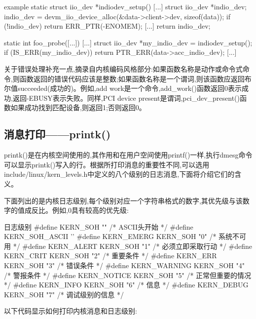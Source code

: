 \documentclass[lang=cn,newtx,10pt,scheme=chinese]{elegantbook}
\begin{document}
\begin{mycode}{example}
static struct iio_dev *indiodev_setup(){
    [...]
    struct iio_dev *indio_dev;
    indio_dev = devm_iio_device_alloc(&data->client->dev, sizeof(data));
    if (!indio_dev)
        return ERR_PTR(-ENOMEM);
    [...]
    return indio_dev;
}

static int foo_probe([...]){
    [...]
    struct iio_dev *my_indio_dev = indiodev_setup();
    if (IS_ERR(my_indio_dev))
        return PTR_ERR(data->acc_indio_dev);
    [...]
}
\end{mycode}

\begin{marker}
关于错误处理补充一点,摘录自内核编码风格部分:如果函数名称是动作或命令式命令,则函数返回的错误代码应该是整数;如果函数名称是一个谓词,则该函数应返回布尔值succeeded(成功的)。例如,add
work是一个命令,add\_work()函数返回0表示成功,返回-EBUSY表示失败。同样,PCI device present是谓词,pci\_dev\_present()函数如果成功找到匹配设备,则返回1;否则返回0。
\end{marker}

\subsection{消息打印——printk()}

printk()是在内核空间使用的,其作用和在用户空间使用printf()一样,执行dmesg命令可以显示printk()写入的行。根据所打印消息的重要性不同,可以选用include/linux/kern\_levels.h中定义的八个级别的日志消息,下面将介绍它们的含义。

下面列出的是内核日志级别,每个级别对应一个字符串格式的数字,其优先级与该数字的值成反比。例如,0具有较高的优先级:

\begin{mycode}{日志级别}
#define KERN_SOH                ""          /* ASCII头开始 */
#define KERN_SOH_ASCII          ''
#define KERN_EMERG              KERN_SOH "0"    /* 系统不可用 */
#define KERN_ALERT              KERN_SOH "1"    /* 必须立即采取行动 */
#define KERN_CRIT               KERN_SOH "2"    /* 重要条件 */
#define KERN_ERR                KERN_SOH "3"    /* 错误条件 */
#define KERN_WARNING            KERN_SOH "4"    /* 警报条件 */
#define KERN_NOTICE             KERN_SOH "5"    /* 正常但重要的情况 */
#define KERN_INFO               KERN_SOH "6"    /* 信息 */
#define KERN_DEBUG              KERN_SOH "7"    /* 调试级别的信息 */
\end{mycode}

以下代码显示如何打印内核消息和日志级别:
\end{document}
